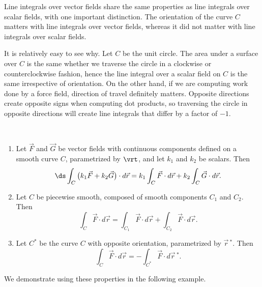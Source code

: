 Line integrals over vector fields share the same properties as line integrals over scalar fields, with one important distinction. The orientation of the curve $C$ matters with line integrals over vector fields, whereas it did not matter with line integrals over scalar fields.

It is relatively easy to see why. Let $C$ be the unit circle. The area under a surface over $C$ is the same whether we traverse the circle in a clockwise or counterclockwise fashion, hence the line integral over a scalar field on $C$ is the same irrespective of orientation. On the other hand, if we are computing work done by a force field, direction of travel definitely matters. Opposite directions create opposite signs when computing dot products, so traversing the circle in opposite directions will create line integrals that differ by a factor of $-1$. 

{\mbox{}\\[-2\baselineskip]
\begin{enumerate}
	\item	Let $\vec F$ and $\vec G$ be  vector fields with continuous components defined on a smooth curve $C$, parametrized by $\vrt$, and let $k_1$ and $k_2$ be scalars. Then
	\[
	\ds \int_C\big(k_1\vec F+k_2\vec G\big)\cdot d\vec r
	= k_1\int_C\vec F\cdot d\vec r +k_2\int_C\vec G\cdot d\vec r.
	\]
	\item Let $C$ be piecewise smooth, composed of smooth components $C_1$ and $C_2$. Then
	\[
	\int_C\vec F\cdot d\vec r
	= \int_{C_1}\vec F\cdot d\vec r + \int_{C_2}\vec F\cdot d\vec r.
	\]
	\item	Let $C^*$ be the curve $C$ with opposite orientation, parametrized by $\vec r\,^*$. Then
	\[\int_C\vec F\cdot d\vec r = -\int_{C^*}\vec F\cdot d\vec r\,^*.\]
	\end{enumerate}}

We demonstrate using these properties in the following example.

